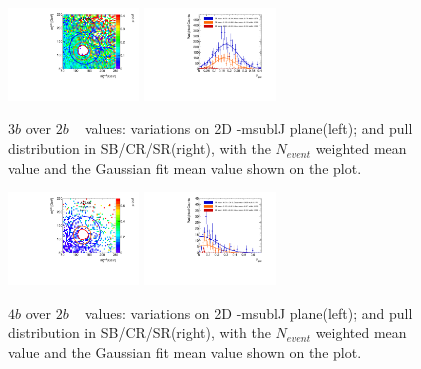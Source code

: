 \begin{figure}[htbp!]
\begin{center}
\includegraphics[width=0.31\textwidth,angle=-90]{figures/boosted/AppendixMuqcdstudy/ThreeTag_Incl_mH0H1.pdf}
\includegraphics[width=0.31\textwidth,angle=-90]{figures/boosted/AppendixMuqcdstudy/ThreeTag_Incl_mH0H1_pull.pdf}
\caption{$3b$ over $2b$ \muqcd~ values: \muqcd variations on 2D \mleadJ-msublJ plane(left); and \muqcd pull distribution in SB/CR/SR(right), with the $N_{event}$ weighted mean value and the Gaussian fit mean value shown on the plot.}
\label{fig:app-muqcd-3b}
\end{center}
\end{figure}

\begin{figure}[htbp!]
\begin{center}
\includegraphics[width=0.31\textwidth,angle=-90]{figures/boosted/AppendixMuqcdstudy/FourTag_Incl_mH0H1.pdf}
\includegraphics[width=0.31\textwidth,angle=-90]{figures/boosted/AppendixMuqcdstudy/FourTag_Incl_mH0H1_pull.pdf}
\caption{$4b$ over $2b$ \muqcd~ values: \muqcd variations on 2D \mleadJ-msublJ plane(left); and \muqcd pull distribution in SB/CR/SR(right), with the $N_{event}$ weighted mean value and the Gaussian fit mean value shown on the plot.}
\label{fig:app-muqcd-4b}
\end{center}
\end{figure}

